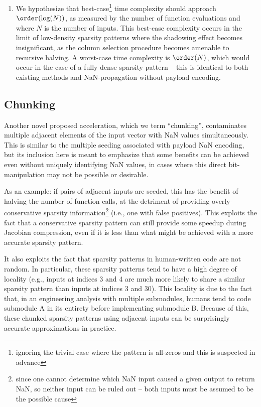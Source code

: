 \documentclass{article}
\begin{document}
\begin{enumerate}
          As a practical matter, one possible objective function of this optimization formulation is to maximize the expected value of information gain (measured by entropy) in the sparsity pattern, given the current belief state. In principle, this is similar to some forms of Bayesian optimization.

    \item We hypothesize that best-case\footnote{ignoring the trivial case where the pattern is all-zeros and this is suspected in advance} time complexity should approach $\order(\log(N))$, as measured by the number of function evaluations and where $N$ is the number of inputs. This best-case complexity occurs in the limit of low-density sparsity patterns where the shadowing effect becomes insignificant, as the column selection procedure becomes amenable to recursive halving. A worst-case time complexity is $\order(N)$, which would occur in the case of a fully-dense sparsity pattern -- this is identical to both existing methods and NaN-propagation without payload encoding.
\end{enumerate}

\subsection{Chunking}

Another novel proposed acceleration, which we term ``chunking'', contaminates multiple adjacent elements of the input vector with NaN values simultaneously. This is similar to the multiple seeding associated with payload NaN encoding, but its inclusion here is meant to emphasize that some benefits can be achieved even without uniquely identifying NaN values, in cases where this direct bit-manipulation may not be possible or desirable.

As an example: if pairs of adjacent inputs are seeded, this has the benefit of halving the number of function calls, at the detriment of providing overly-conservative sparsity information\footnote{since one cannot determine which NaN input caused a given output to return NaN, so neither input can be ruled out -- both inputs must be assumed to be the possible cause} (i.e., one with false positives). This exploits the fact that a conservative sparsity pattern can still provide some speedup during Jacobian compression, even if it is less than what might be achieved with a more accurate sparsity pattern.

It also exploits the fact that sparsity patterns in human-written code are not random. In particular, these sparsity patterns tend to have a high degree of locality (e.g., inputs at indices 3 and 4 are much more likely to share a similar sparsity pattern than inputs at indices 3 and 30). This locality is due to the fact that, in an engineering analysis with multiple submodules, humans tend to code submodule A in its entirety before implementing submodule B. Because of this, these chunked sparsity patterns using adjacent inputs can be surprisingly accurate approximations in practice.
\end{document}
